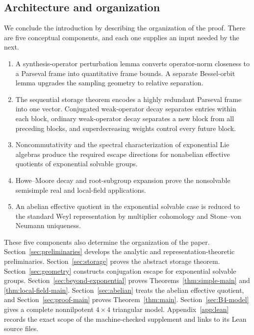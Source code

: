 \documentclass[reqno]{amsart}
\numberwithin{equation}{section}
\theoremstyle{definition}
\theoremstyle{remark}
\begin{document}
\subsection{Architecture and organization}

We conclude the introduction by describing the organization of the proof.
There are five conceptual components, and each one supplies an input needed
by the next.
\begin{enumerate}[label=\textnormal{\textbf{Step \arabic*.}},leftmargin=*]
\item A synthesis-operator perturbation lemma converts operator-norm
closeness to a Parseval frame into quantitative frame bounds.  A separate
Bessel-orbit lemma upgrades the sampling geometry to relative separation.
\item The sequential storage theorem encodes a highly redundant Parseval
frame into one vector.  Conjugated weak-operator decay separates entries
within each block, ordinary weak-operator decay separates a new block from
all preceding blocks, and superdecreasing weights control every future block.
\item Noncommutativity and the spectral characterization of exponential Lie
algebras produce the required escape directions for nonabelian effective
quotients of exponential solvable groups.
\item Howe--Moore decay and root-subgroup expansion prove the nonsolvable
semisimple real and local-field applications.
\item An abelian effective quotient in the exponential solvable case is
reduced to the standard Weyl representation by multiplier cohomology and
Stone--von Neumann uniqueness.
\end{enumerate}

These five components also determine the organization of the paper.
Section~\ref{sec:preliminaries} develops the analytic and
representation-theoretic preliminaries.  Section~\ref{sec:storage} proves the
abstract storage theorem.  Section~\ref{sec:geometry} constructs conjugation
escape for exponential solvable groups.  Section~\ref{sec:beyond-exponential}
proves Theorems~\ref{thm:simple-main} and \ref{thm:local-field-main}.
Section~\ref{sec:abelian} treats the
abelian effective quotient, and Section~\ref{sec:proof-main} proves
Theorem~\ref{thm:main}.  Section~\ref{sec:B4-model} gives a complete
nonnilpotent $4\times4$ triangular model.  Appendix~\ref{app:lean} records the exact scope of
the machine-checked supplement and links to its Lean source files.
\end{document}
